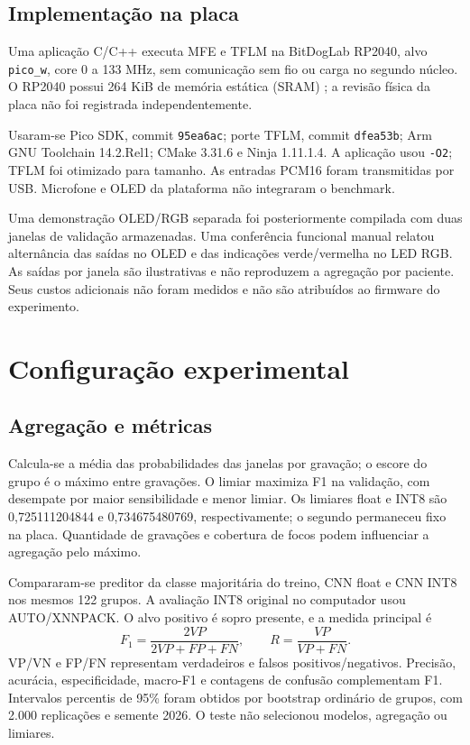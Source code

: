 \documentclass[9pt,twocolumn,twoside,lineno]{MSBJournal}
\begin{document}
\subsection{Implementação na placa}
Uma aplicação C/C++ executa MFE e TFLM na BitDogLab RP2040, alvo \texttt{pico\_w}, core 0 a 133 MHz, sem comunicação sem fio ou carga no segundo núcleo. O RP2040 possui 264 KiB de memória estática (SRAM) \citep{rp2040docs}; a revisão física da placa não foi registrada independentemente.

Usaram-se Pico SDK, commit \texttt{95ea6ac}; porte TFLM, commit \texttt{dfea53b}; Arm GNU Toolchain 14.2.Rel1; CMake 3.31.6 e Ninja 1.11.1.4. A aplicação usou \texttt{-O2}; TFLM foi otimizado para tamanho. As entradas PCM16 foram transmitidas por USB. Microfone e OLED da plataforma \citep{bitdoglab} não integraram o benchmark.

Uma demonstração OLED/RGB separada foi posteriormente compilada com duas janelas de validação armazenadas. Uma conferência funcional manual relatou alternância das saídas no OLED e das indicações verde/vermelha no LED RGB. As saídas por janela são ilustrativas e não reproduzem a agregação por paciente. Seus custos adicionais não foram medidos e não são atribuídos ao firmware do experimento.

\section{Configuração experimental}
\subsection{Agregação e métricas}
Calcula-se a média das probabilidades das janelas por gravação; o escore do grupo é o máximo entre gravações. O limiar maximiza F1 na validação, com desempate por maior sensibilidade e menor limiar. Os limiares float e INT8 são 0,725111204844 e 0,734675480769, respectivamente; o segundo permaneceu fixo na placa. Quantidade de gravações e cobertura de focos podem influenciar a agregação pelo máximo.

Compararam-se preditor da classe majoritária do treino, CNN float e CNN INT8 nos mesmos 122 grupos. A avaliação INT8 original no computador usou AUTO/XNNPACK. O alvo positivo é sopro presente, e a medida principal é
\begin{equation}
F_1=\frac{2VP}{2VP+FP+FN},\qquad R=\frac{VP}{VP+FN}.
\end{equation}
VP/VN e FP/FN representam verdadeiros e falsos positivos/negativos. Precisão, acurácia, especificidade, macro-F1 e contagens de confusão complementam F1. Intervalos percentis de 95\% foram obtidos por bootstrap ordinário de grupos, com 2.000 replicações e semente 2026. O teste não selecionou modelos, agregação ou limiares.
\end{document}
